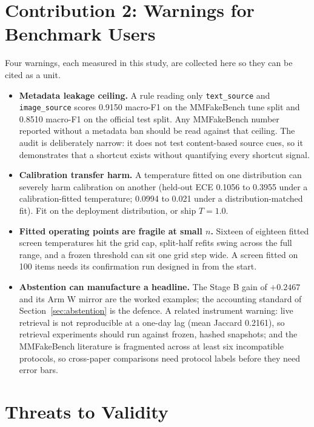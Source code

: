 \documentclass[conference]{IEEEtran}
\begin{document}
\section{Contribution 2: Warnings for Benchmark Users}
\label{sec:warnings}

Four warnings, each measured in this study, are collected here so they can be cited as a unit.

\begin{itemize}
\item \textbf{Metadata leakage ceiling.} A rule reading only \texttt{text\_source} and \texttt{image\_source} scores 0.9150 macro-F1 on the MMFakeBench tune split and 0.8510 macro-F1 on the official test split. Any MMFakeBench number reported without a metadata ban should be read against that ceiling. The audit is deliberately narrow: it does not test content-based source cues, so it demonstrates that a shortcut exists without quantifying every shortcut signal.
\item \textbf{Calibration transfer harm.} A temperature fitted on one distribution can severely harm calibration on another (held-out ECE 0.1056 to 0.3955 under a calibration-fitted temperature; 0.0994 to 0.021 under a distribution-matched fit). Fit on the deployment distribution, or ship $T=1.0$.
\item \textbf{Fitted operating points are fragile at small $n$.} Sixteen of eighteen fitted screen temperatures hit the grid cap, split-half refits swing across the full range, and a frozen threshold can sit one grid step wide. A screen fitted on 100 items needs its confirmation run designed in from the start.
\item \textbf{Abstention can manufacture a headline.} The Stage B gain of $+0.2467$ and its Arm W mirror are the worked examples; the accounting standard of Section~\ref{sec:abstention} is the defence. A related instrument warning: live retrieval is not reproducible at a one-day lag (mean Jaccard 0.2161), so retrieval experiments should run against frozen, hashed snapshots; and the MMFakeBench literature is fragmented across at least six incompatible protocols, so cross-paper comparisons need protocol labels before they need error bars.
\end{itemize}

\section{Threats to Validity}
\end{document}
